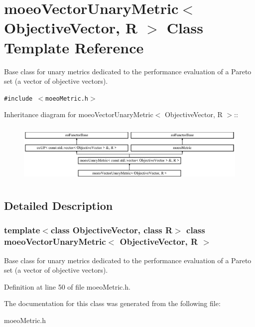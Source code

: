 \section{moeo\-Vector\-Unary\-Metric$<$ Objective\-Vector, R $>$ Class Template Reference}
\label{classmoeoVectorUnaryMetric}
Base class for unary metrics dedicated to the performance evaluation of a Pareto set (a vector of objective vectors).  


{\tt \#include $<$moeo\-Metric.h$>$}

Inheritance diagram for moeo\-Vector\-Unary\-Metric$<$ Objective\-Vector, R $>$::\begin{figure}[H]
\begin{center}
\leavevmode
\includegraphics[height=2.91667cm]{classmoeoVectorUnaryMetric}
\end{center}
\end{figure}


\subsection{Detailed Description}
\subsubsection*{template$<$class Objective\-Vector, class R$>$ class moeo\-Vector\-Unary\-Metric$<$ Objective\-Vector, R $>$}

Base class for unary metrics dedicated to the performance evaluation of a Pareto set (a vector of objective vectors). 



Definition at line 50 of file moeo\-Metric.h.

The documentation for this class was generated from the following file:\begin{CompactItemize}
\item 
moeo\-Metric.h\end{CompactItemize}
